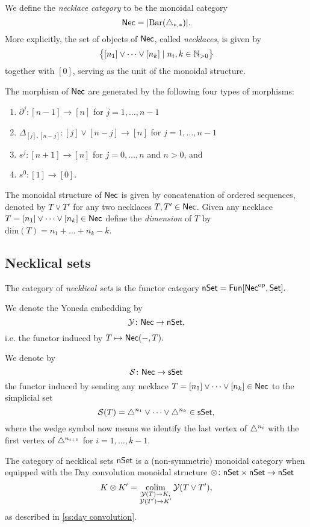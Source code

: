 We define the \textit{necklace category} to be the monoidal category
\begin{equation*}
\mathsf{Nec} = \vert{\operatorname{Bar}(\triangle_{*,*})}\vert.
\end{equation*}
More explicitly, the set of objects of $\mathsf{Nec}$, called \textit{necklaces}, is given by
\begin{equation*}
\big\{ [n_1] \vee \cdots \vee[n_k] \mid n_i, k \in \mathbb{N}_{>0} \big\}
\end{equation*}
together with $[0]$, serving as the unit of the monoidal structure.

The morphism of $\mathsf{Nec}$ are generated by the following four types of morphisms:
\begin{enumerate}
	\item $\partial^j \colon [n-1] \to [n]$ for $j = 1, \dots, n-1$
	\item $\Delta_{[j], [n-j]} \colon  [j] \vee [n-j] \to [n]$ for $j = 1, \dots, n-1$
	\item $s^j \colon [n+1] \to [n]$ for $j = 0, \dots, n$ and $n>0$, and 
	\item $s^0 \colon [1] \to [0]$.
\end{enumerate}
The monoidal structure of $\mathsf{Nec}$ is given by concatenation of ordered sequences, denoted by $T \vee T'$ for any two necklaces $T, T' \in \mathsf{Nec}$.
Given any necklace $T = [n_1] \vee \dots \vee[n_k] \in \mathsf{Nec}$ define the \textit{dimension} of $T$ by $\text{dim}(T)=n_1 + \dots + n_k-k$.

\subsection{Necklical sets}

The category of \textit{necklical sets} is the functor category $\mathsf{nSet}=\mathsf{Fun}[\mathsf{Nec}^{\mathrm{op}}, \mathsf{Set}].$

We denote the Yoneda embedding by $$\mathcal{Y} \colon \mathsf{Nec} \to \mathsf{nSet},$$ i.e. the functor induced by $T \mapsto \mathsf{Nec}(-,T).$

We denote by $$\mathcal{S} \colon \mathsf{Nec} \to \mathsf{sSet}$$ the functor induced by sending any necklace $T=[n_1] \vee \dots \vee[n_k] \in \mathsf{Nec}$ to the simplicial set $$\mathcal{S}(T)= \triangle^{n_1} \vee\dots \vee \triangle^{n_k} \in \mathsf{sSet},$$ where the wedge symbol now means we identify the last vertex of $\triangle^{n_i}$ with the first vertex of $\triangle^{n_{i+1}}$ for $i=1,\dots,k-1$.

The category of necklical sets $\mathsf{nSet}$ is a (non-symmetric) monoidal category when equipped with the Day convolution monoidal structure $\otimes\colon \mathsf{nSet} \times \mathsf{nSet} \to \mathsf{nSet}$
$$K \otimes K' = \operatorname*{colim}_{\substack{\mathcal{Y}(T) \to K, \\ \mathcal{Y}(T')\to K'}} \mathcal{Y}(T \vee T'),$$ as described in
 \cref{ss:day convolution}.

